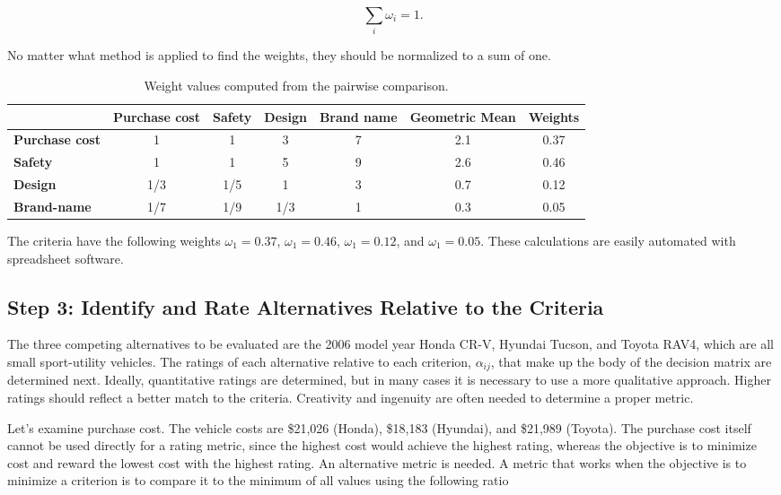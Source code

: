 $$\sum_{i} \omega_{i} = 1.$$

No matter what
method is applied to find the weights, they should be normalized to a
sum of one.

\begin{table}[h]
\caption{Weight values computed from the pairwise comparison.}
\label{table:weightedValuesFromPairwiseCompareSelection}

\begin{tabular}{|g|c|c|c|c|c|c|}
\hline
{}
			 & \textbf{Purchase cost}  & \textbf{Safety} & \textbf{Design} & \textbf{Brand name} & {Geometric Mean} & {Weights}\\ \hline
\textbf{Purchase cost} & 1 & 1 & 3 & 7 & 2.1 & 0.37 \\ \hline
\textbf{Safety} & 1 & 1 & 5 & 9 & 2.6 & 0.46 \\ \hline
\textbf{Design} & 1/3 & 1/5 & 1 & 3 & 0.7 & 0.12 \\ \hline
\textbf{Brand-name} & 1/7 & 1/9 & 1/3 & 1 & 0.3 & 0.05 \\ \hline
\end{tabular}
\end{table}


The criteria have the following weights
$\omega_{1} =0.37$,
$\omega_{1} =0.46$,
$\omega_{1} =0.12$, and
$\omega_{1} =0.05$. These calculations are
easily automated with spreadsheet software.

\subsection*{Step 3: Identify and Rate Alternatives Relative to the Criteria}


The three competing alternatives to be evaluated are the 2006 model year
Honda CR-V, Hyundai Tucson, and Toyota RAV4, which are all small
sport-utility vehicles. The ratings of each alternative relative to each
criterion, $\alpha_{ij}$, that make up the body
of the decision matrix are determined next. Ideally, quantitative
ratings are determined, but in many cases it is necessary to use a more
qualitative approach. Higher ratings should reflect a better match to
the criteria. Creativity and ingenuity are often needed to determine a
proper metric.

Let's examine purchase cost. The vehicle costs are \$21,026 (Honda),
\$18,183 (Hyundai), and \$21,989 (Toyota). The purchase cost itself
cannot be used directly for a rating metric, since the highest cost
would achieve the highest rating, whereas the objective is to minimize
cost and reward the lowest cost with the highest rating. An alternative
metric is needed. A metric that works when the objective is to minimize
a criterion is to compare it to the minimum of all values using the
following ratio

